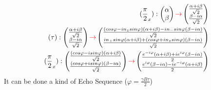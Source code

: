 \documentclass{article}
\begin{document}
\begin{equation}\label{eq28}\begin{aligned}
(\frac{\pi}{2}_x):\begin{pmatrix}\alpha \\\beta  \end{pmatrix}\textcolor{red}{\rightarrow}\begin{pmatrix}\frac{\alpha+i\beta}{\sqrt{2}} \\ \frac{\beta-i\alpha}{\sqrt{2}} \end{pmatrix}\\
(\tau):\begin{pmatrix}\frac{\alpha+i\beta}{\sqrt{2}}\\ \frac{\beta-i\alpha}{\sqrt{2}} \end{pmatrix}\textcolor{red}{\rightarrow}\begin{pmatrix}\frac{(cos\varphi-in_zsin\varphi)(\alpha+i\beta)-in_-sin\varphi(\beta-i\alpha)}{\sqrt{2}}\\\frac{in_+sin\varphi(\alpha+i\beta)+(cos\varphi+in_zsin\varphi)(\beta-i\alpha)}{\sqrt{2}} \end{pmatrix}\\
(\frac{\pi}{2}_x):\begin{pmatrix}\frac{(cos\varphi-isin\varphi)(\alpha+i\beta)}{\sqrt{2}}\\\frac{(cos\varphi+isin\varphi)(\beta-i\alpha)}{\sqrt{2}} \end{pmatrix}\textcolor{red}{\rightarrow}
\begin{pmatrix} \frac{e^{-i\varphi}(\alpha+i\beta)+ie^{i\varphi}(\beta-i\alpha)}{2}\\ \frac{e^{i\varphi}(\beta-i\alpha)-ie^{-i\varphi}(\alpha+i\beta)}{2}\end{pmatrix} \end{aligned}\end{equation}
It can be done a kind of Echo Sequence ($\varphi=\frac{\gamma B\tau}{2}$)
\end{document}

